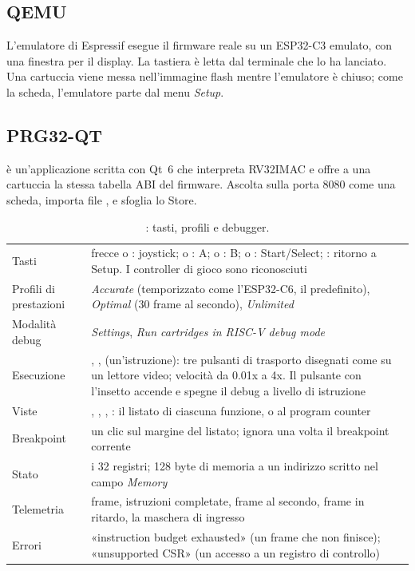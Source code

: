 \subsection{QEMU}

L'emulatore di Espressif esegue il firmware reale su un ESP32-C3 emulato, con
una finestra per il display. La tastiera è letta dal terminale che lo ha
lanciato. Una cartuccia viene messa nell'immagine flash mentre l'emulatore è
chiuso; come la scheda, l'emulatore parte dal menu \emph{Setup}.

\subsection{PRG32-QT}

\prgqt è un'applicazione scritta con Qt~6 che interpreta RV32IMAC e offre a
una cartuccia la stessa tabella ABI del firmware. Ascolta sulla porta 8080 come
una scheda, importa file , e sfoglia lo Store.

\begin{table}[htb]
\centering\small
\caption{\prgqt: tasti, profili e debugger.}\label{tab:prg:qt}
\begin{tabularx}{\textwidth}{@{}P{0.26\textwidth}L@{}}
\toprule
Tasti & frecce o : joystick;  o : A;  o : B;  o : Start/Select; : ritorno a Setup. I controller di gioco sono riconosciuti\\
Profili di prestazioni & \emph{Accurate} (temporizzato come l'ESP32-C6, il predefinito), \emph{Optimal} (30 frame al secondo), \emph{Unlimited}\\
Modalità debug & \emph{Settings}, \emph{Run cartridges in RISC-V debug mode}\\
Esecuzione & , ,  (un'istruzione): tre pulsanti di trasporto disegnati come su un lettore video; velocità da 0.01x a 4x. Il pulsante con l'insetto accende e spegne il debug a livello di istruzione\\
Viste & , , , : il listato di ciascuna funzione, o al program counter\\
Breakpoint & un clic sul margine del listato;  ignora una volta il breakpoint corrente\\
Stato & i 32 registri; 128 byte di memoria a un indirizzo scritto nel campo \emph{Memory}\\
Telemetria & frame, istruzioni completate, frame al secondo, frame in ritardo, la maschera di ingresso\\
Errori & «instruction budget exhausted» (un frame che non finisce); «unsupported CSR» (un accesso a un registro di controllo)\\
\bottomrule
\end{tabularx}
\end{table}


